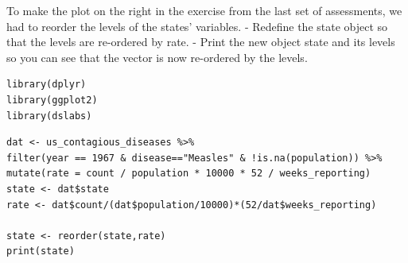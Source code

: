 \documentclass[
]{article}
\begin{document}
To make the plot on the right in the exercise from the last set of
assessments, we had to reorder the levels of the states' variables. -
Redefine the state object so that the levels are re-ordered by rate. -
Print the new object state and its levels so you can see that the vector
is now re-ordered by the levels.

\begin{verbatim}
library(dplyr)
library(ggplot2)
library(dslabs)
\end{verbatim}

\begin{verbatim}
dat <- us_contagious_diseases %>%
filter(year == 1967 & disease=="Measles" & !is.na(population)) %>% mutate(rate = count / population * 10000 * 52 / weeks_reporting)
state <- dat$state 
rate <- dat$count/(dat$population/10000)*(52/dat$weeks_reporting)

state <- reorder(state,rate)
print(state)
\end{verbatim}
\end{document}
